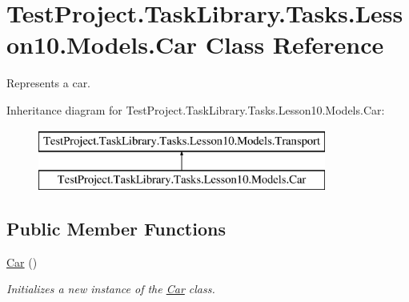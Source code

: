 \hypertarget{class_test_project_1_1_task_library_1_1_tasks_1_1_lesson10_1_1_models_1_1_car}{}\section{Test\+Project.\+Task\+Library.\+Tasks.\+Lesson10.\+Models.\+Car Class Reference}
\label{class_test_project_1_1_task_library_1_1_tasks_1_1_lesson10_1_1_models_1_1_car}


Represents a car.  


Inheritance diagram for Test\+Project.\+Task\+Library.\+Tasks.\+Lesson10.\+Models.\+Car\+:\begin{figure}[H]
\begin{center}
\leavevmode
\includegraphics[height=2.000000cm]{class_test_project_1_1_task_library_1_1_tasks_1_1_lesson10_1_1_models_1_1_car}
\end{center}
\end{figure}
\subsection*{Public Member Functions}
\begin{DoxyCompactItemize}
\item 
\mbox{\hyperlink{class_test_project_1_1_task_library_1_1_tasks_1_1_lesson10_1_1_models_1_1_car_adc0273608062cd65052471f0699bf2a5}{Car}} ()
\begin{DoxyCompactList}\small\item\em Initializes a new instance of the \mbox{\hyperlink{class_test_project_1_1_task_library_1_1_tasks_1_1_lesson10_1_1_models_1_1_car}{Car}} class. \end{DoxyCompactList}\end{DoxyCompactItemize}
